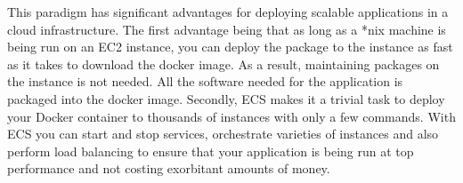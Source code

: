 This paradigm has significant advantages for deploying scalable applications
in a cloud infrastructure. The first advantage being that as long as a *nix
machine is being run on an EC2 instance, you can deploy the package to the instance as
fast as it takes to download the docker image. As a result, maintaining packages
on the instance is not needed. All the software needed for the application
is packaged into the docker image. Secondly, ECS makes it a trivial task to deploy
your Docker container to thousands of instances with only a few commands. With
ECS you can start and stop services, orchestrate varieties of instances and
also perform load balancing to ensure that your application is being run at
top performance and not costing exorbitant amounts of money.

